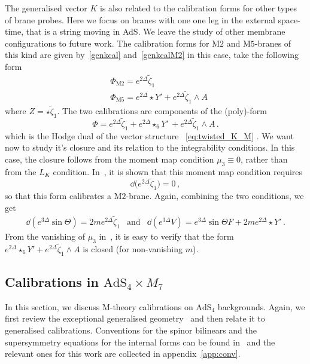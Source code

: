 \documentclass[debug]{phd}
\begin{document}
The generalised vector $K$ is also related to the calibration forms for other types of brane probes. 
Here we focus on branes with one one leg in the external space-time, that is a string moving in AdS. 
We leave the study of other membrane configurations to future work.
The calibration forms for $\mathrm{M}2$ and $\mathrm{M}5$-branes of this kind are given by~\eqref{genkcal} and~\eqref{genkcalM2} in this case, take the following form
%
	\begin{align}
		& \Phi_{\mathrm{M}2} = e^{2\Delta} \tilde{\zeta}_1 \\
		& \Phi_{\mathrm{M}5} = e^{2\Delta} \star Y' + e^{2\Delta} \tilde{\zeta}_1 \wedge A 
	\end{align}
%
where $Z = \star \tilde{\zeta}_1$. 
The two calibrations are components of the (poly)-form 
%
	\begin{equation}
	\label{eq:cal_M_q1}
		\Phi= e^{2\Delta}\tilde{\zeta}_1 +e^{2\Delta}\star_6 Y'\, + e^{2\Delta} \tilde{\zeta}_1 \wedge A\, .
	\end{equation}
%
which is the Hodge dual of the vector structure ~\eqref{eq:twisted_K_M} . 
We want now to study it's closure and its relation to the integrability conditions.
In this case, the closure follows from the moment map condition $\mu_3 \equiv 0$, rather than from the $L_{K}$ condition. 
In~\cite{AshmoreESE}, it is shown that this moment map condition requires
%
\begin{equation}
	\dd  \bigl( e^{2\Delta} \tilde{\zeta}_1\bigr) = 0\, ,
\end{equation}
%
so that this form calibrates a $\mathrm{M}2$-brane. 
Again, combining the two conditions, we get
%
\begin{equation}
	\begin{array}{lcr}
		\dd  \left( e^{3\Delta} \sin\Theta \right) = 2 m e^{2\Delta} \tilde{\zeta}_1 & \mbox{and} & \dd  \left( e^{3\Delta} V\right) = e^{3\Delta} \sin \Theta F + 2m e^{2\Delta} \star Y'\, .
	 \end{array}
\end{equation}
%
From the vanishing of $\mu_3$ in~\cite{AshmoreESE}, it is easy to verify that the form $e^{2\Delta} \star_6 Y' + e^{2\Delta}\tilde{\zeta}_1 \wedge A$ is closed (for non-vanishing $m$).
%
%
%
\subsection{\texorpdfstring{Calibrations in $\mathrm{AdS}_4 \times M_7$}{Calibrations on AdS4 x M7}}
\label{M-thAdS4}
%
In this section, we discuss M-theory calibrations on $\mathrm{AdS}_4$ backgrounds. 
Again, we first review the exceptional generalised geometry~\cite{AshmoreESE} and then relate it to generalised calibrations.
Conventions for the spinor bilinears and the supersymmetry equations for the internal forms can be found in~\cite{Gabella:2012rc} and the relevant ones for this work are collected in appendix~\ref{app:conv}. 
\end{document}
